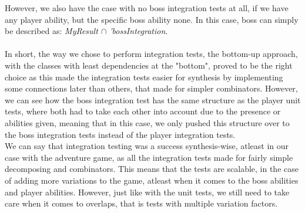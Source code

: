 However, we also have the case with no boss integration tests at all, if we have any player ability, but the specific boss ability none. In this case, boss can simply be described as: \textit{MyResult $\cap$ 'bossIntegration}. \\
\\
In short, the way we chose to perform integration tests, the bottom-up approach, with the classes with least dependencies at the "bottom", proved to be the right choice as this made the integration tests easier for synthesis by implementing some connections later than others, that made for simpler combinators. However, we can see how the boss integration test has the same structure as the player unit tests, where both had to take each other into account due to the presence or abilities given, meaning that in this case, we only pushed this structure over to the boss integration tests instead of the player integration tests. \\
We can say that integration testing was a success synthesis-wise, atleast in our case with the adventure game, as all the integration tests made for fairly simple decomposing and combinators. This means that the tests are scalable, in the case of adding more variations to the game, atleast when it comes to the boss abilities and player abilities. However, just like with the unit tests, we still need to take care when it comes to overlaps, that is tests with multiple variation factors.